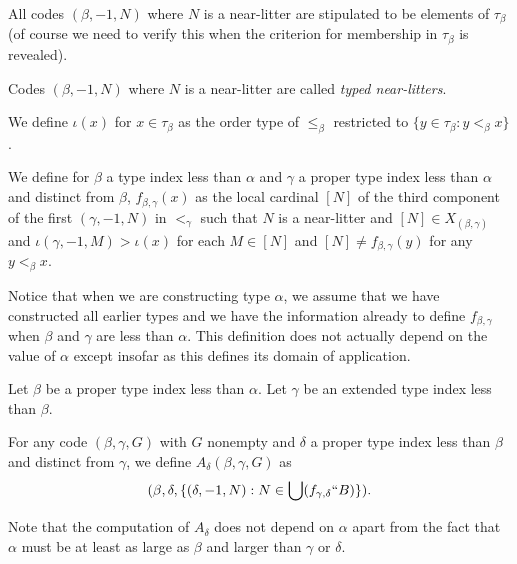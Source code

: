\begin{lemma}
\label {lem:near-litter-code}     
All codes $(\beta,-1,N)$ where $N$ is a near-litter are stipulated to be elements of $\tau_\beta$ (of course we need to verify this when the criterion for membership in $\tau_\beta$ is revealed).
\end{lemma}

\begin{definition}
\label {def:typed-near-litter}   
Codes $(\beta,-1,N)$ where $N$ is a near-litter are called {\em typed near-litters\/}.
\end{definition}

\begin{definition}
\label {def:iota}  
We define $\iota(x)$ for $x \in \tau_\beta$ as the order type of $\leq_\beta$ restricted to $\{y \in \tau_\beta:y <_\beta x\}$.
\end{definition}

\begin{definition}
\label {fmap}   
We define for $\beta$ a type index less than $\alpha$ and $\gamma$ a proper type index less than $\alpha$ and distinct from $\beta$,   $f_{\beta,\gamma}(x)$ as the local cardinal $[N]$ of the third component of the first $(\gamma,-1,N)$ in $<_\gamma$ such that $N$ is a near-litter and $[N] \in X_{(\beta,\gamma)}$ and $\iota(\gamma,-1,M)>\iota(x)$ for each $M \in [N]$ and $[N] \neq f_{\beta,\gamma}(y)$ for any $y <_\beta x$.
\end{definition}

Notice that when we are constructing type $\alpha$, we assume that we have constructed all earlier types and we have the information already to define $f_{\beta,\gamma}$ when $\beta$ and $\gamma$ are less than $\alpha$.   This definition does not actually depend on the value of $\alpha$ except insofar as this defines its domain of application.

\begin{definition}
\label {def:alt-ext}   
Let $\beta$ be a proper type index less than $\alpha$.  Let $\gamma$ be an extended type index less than $\beta$.

For any code $(\beta,\gamma,G)$ with $G$ nonempty and $\delta$ a proper type index less than $\beta$ and distinct from $\gamma$, we define
$A_\delta(\beta,\gamma,G)$ as $$(\beta,\delta,\{(\delta,-1,N):N \in \bigcup (f_{\gamma,\delta}``B)\}).$$

Note that the computation of $A_\delta$ does not depend on $\alpha$ apart from the fact that $\alpha$ must be at least as large as $\beta$ and larger than $\gamma$ or $\delta$.
\end{definition}

